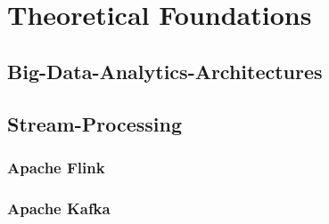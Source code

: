 \chapter{Theoretical Foundations}
\section{Big-Data-Analytics-Architectures}
\section{Stream-Processing}
\subsection{Apache Flink}
\subsection{Apache Kafka}